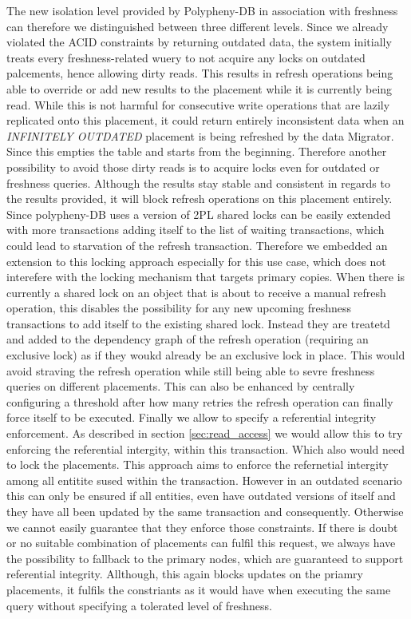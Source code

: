 The new isolation level provided by Polypheny-DB in association with freshness can therefore we distinguished between three different levels.
Since we already violated the ACID constraints by returning outdated data, the system initially treats every freshness-related wuery to not acquire any locks on outdated palcements, 
hence allowing dirty reads. This results in refresh operations being able to override or add new results to the placement while it is currently being read. 
While this is not harmful for consecutive write operations that are lazily replicated onto this placement, it could return entirely inconsistent data when 
an \emph{INFINITELY OUTDATED} placement is being refreshed by the data Migrator. Since this empties the table and starts from the beginning. 
Therefore another possibility to avoid those dirty reads is to acquire locks even for outdated or freshness queries. Although the results stay stable and consistent in regards to
the results provided, it will block refresh operations on this placement entirely. Since polypheny-DB uses a version of 2PL shared locks can be easily extended with more transactions adding
itself to the list of waiting transactions, which could lead to starvation of the refresh transaction. Therefore we embedded an extension to this locking approach especially for this use case, which does not interefere with 
the locking mechanism that targets primary copies. When there is currently a shared lock on an object that is about to receive a manual refresh operation, this disables the possibility
for any new upcoming freshness transactions to add itself to the existing shared lock. Instead they are treatetd and added to the dependency graph of the refresh operation (requiring an exclusive lock)
as if they woukd already be an exclusive lock in place. This would avoid straving the refresh operation while still being able to sevre freshness queries on different placements.
This can also be enhanced by centrally configuring  a threshold after how many retries the refresh operation can finally force itself to be executed.
Finally we allow to specify a referential integrity enforcement. As described in section \ref{sec:read_access} we would allow this to try enforcing the referential intergity,
within this transaction. Which also would need to lock the placements. This approach aims to enforce the refernetial intergity among all entitite sused within the transaction.
However in an outdated scenario this can only be ensured if all entities, even have outdated versions of itself and they have all been updated by the same 
transaction and consequently. Otherwise we cannot easily guarantee that they enforce those constraints. If there is doubt or no suitable combination of placements can fulfil this request,
we always have the possibility to fallback to the primary nodes, which are guaranteed to support referential integrity. Allthough, this again blocks updates on the priamry placements,
it fulfils the constriants as it would have when executing the same query without specifying a tolerated level of freshness.
